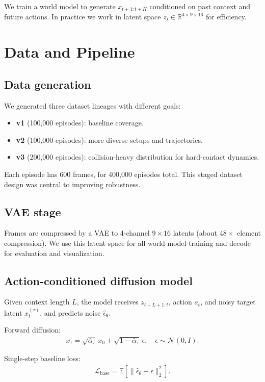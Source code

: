 \documentclass[11pt]{article}
\begin{document}
We train a world model to generate $x_{t+1:t+H}$ conditioned on past context and future actions. In practice we work in latent space $z_t\in\mathbb{R}^{4\times 9\times 16}$ for efficiency.

\section{Data and Pipeline}
\subsection{Data generation}
We generated three dataset lineages with different goals:
\begin{itemize}[leftmargin=*]
  \item \textbf{v1} (100,000 episodes): baseline coverage.
  \item \textbf{v2} (100,000 episodes): more diverse setups and trajectories.
  \item \textbf{v3} (200,000 episodes): collision-heavy distribution for hard-contact dynamics.
\end{itemize}
Each episode has 600 frames, for 400,000 episodes total. This staged dataset design was central to improving robustness.

\subsection{VAE stage}
Frames are compressed by a VAE to 4-channel $9\times 16$ latents (about $48\times$ element compression). We use this latent space for all world-model training and decode for evaluation and visualization.

\subsection{Action-conditioned diffusion model}
Given context length $L$, the model receives $z_{t-L+1:t}$, action $a_t$, and noisy target latent $x_t^{(\tau)}$, and predicts noise $\hat{\epsilon}_\theta$.

Forward diffusion:
\begin{align}
x_\tau = \sqrt{\bar{\alpha}_\tau}\,x_0 + \sqrt{1-\bar{\alpha}_\tau}\,\epsilon,\quad \epsilon\sim\mathcal{N}(0,I).
\end{align}

Single-step baseline loss:
\begin{align}
\mathcal{L}_{\text{base}} = \mathbb{E}\left[\|\hat{\epsilon}_\theta - \epsilon\|_2^2\right].
\end{align}
\end{document}
